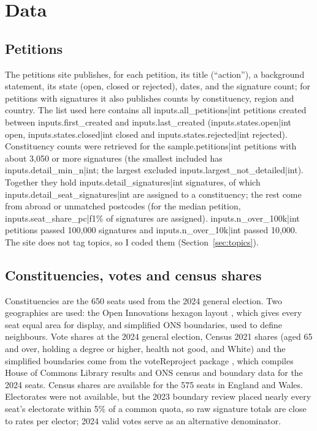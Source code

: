 \documentclass[11pt,a4paper]{article}
\begin{document}
\section{Data}\label{sec:data}
\subsection{Petitions}
The petitions site \citep{petitions2026} publishes, for each petition, its title (``action''), a background statement, its state (open, closed or rejected), dates, and the signature count; for petitions with signatures it also publishes counts by constituency, region and country. The list used here contains all {{inputs.all_petitions|int}} petitions created between {{inputs.first_created}} and {{inputs.last_created}} ({{inputs.states.open|int}} open, {{inputs.states.closed|int}} closed and {{inputs.states.rejected|int}} rejected). Constituency counts were retrieved for the {{sample.petitions|int}} petitions with about 3,050 or more signatures (the smallest included has {{inputs.detail_min_n|int}}; the largest excluded {{inputs.largest_not_detailed|int}}). Together they hold {{inputs.detail_signatures|int}} signatures, of which {{inputs.detail_seat_signatures|int}} are assigned to a constituency; the rest come from abroad or unmatched postcodes (for the median petition, {{inputs.seat_share_pc|f1}}\% of signatures are assigned). {{inputs.n_over_100k|int}} petitions passed 100,000 signatures and {{inputs.n_over_10k|int}} passed 10,000. The site does not tag topics, so I coded them (Section~\ref{sec:topics}).

\subsection{Constituencies, votes and census shares}
Constituencies are the 650 seats used from the 2024 general election. Two geographies are used: the Open Innovations hexagon layout \citep{openinnovations2023}, which gives every seat equal area for display, and simplified ONS boundaries, used to define neighbours. Vote shares at the 2024 general election, Census 2021 shares (aged 65 and over, holding a degree or higher, health not good, and White) and the simplified boundaries come from the voteReproject package \citep{horan2025}, which compiles House of Commons Library results and ONS census and boundary data for the 2024 seats. Census shares are available for the 575 seats in England and Wales. Electorates were not available, but the 2023 boundary review placed nearly every seat's electorate within 5\% of a common quota, so raw signature totals are close to rates per elector; 2024 valid votes serve as an alternative denominator.
\end{document}
